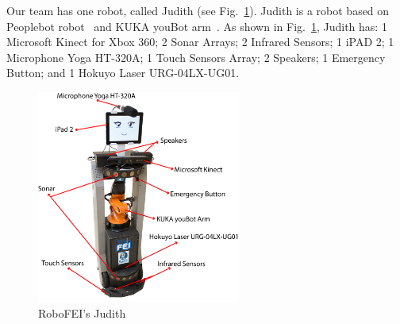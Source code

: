 Our team has one robot, called Judith (see Fig.~\ref{fig:judith}). Judith is a robot based on Peoplebot robot~\cite{peoplebot:2001} and KUKA youBot arm~\cite{youbot:2016}. As shown in Fig.~\ref{fig:judith}, Judith has: 1 Microsoft Kinect for Xbox 360; 2 Sonar Arrays; 2 Infrared Sensors; 1 iPAD 2; 1 Microphone Yoga HT-320A; 1 Touch Sensors Array; 2 Speakers; 1 Emergency Button; and 1 Hokuyo Laser URG-04LX-UG01.

\begin{figure}[ht!]
    \centering
    \includegraphics[height = 7.0cm]{figures/judith_info.png}
    \caption{RoboFEI's Judith}
    \label{fig:judith}
\end{figure}
